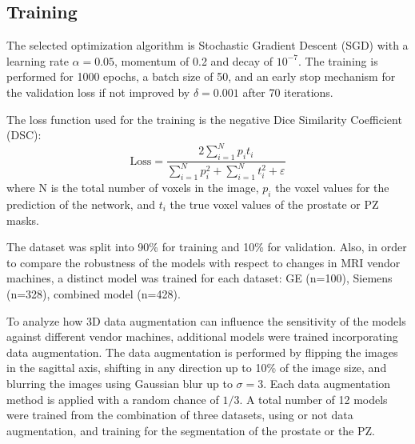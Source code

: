 \subsection{Training}
\label{subsec:training}
The selected optimization algorithm is Stochastic Gradient Descent (SGD) with a learning rate $\alpha = 0.05$, momentum of 0.2 and decay of $10^{-7}$. The training is performed for 1000 epochs, a batch size of 50, and an early stop mechanism for the validation loss if not improved by $\delta = 0.001$ after 70 iterations. 

The loss function used for the training is the negative Dice Similarity Coefficient (DSC):
\begin{equation}
\text{Loss} = \frac{2 \sum_{i=1}^{N}p_it_i}{\sum_{i=1}^{N}p_i^2 + \sum_{i=1}^{N}t_i^2 + \varepsilon} 
\label{eq:dsc}
\end{equation}
where N is the total number of voxels in the image, $p_i$ the voxel values for the prediction of the network, and $t_i$ the true voxel values of the prostate or PZ masks.

The dataset was split into 90\% for training and 10\% for validation. Also, in order to compare the robustness of the models with respect to changes in MRI vendor machines,  a distinct model was trained for each dataset: GE (n=100), Siemens (n=328), combined model (n=428). 

To analyze how 3D data augmentation can influence the sensitivity of the models against different vendor machines, additional models were trained incorporating data augmentation. The data augmentation is performed by flipping the images in the sagittal axis,  shifting in any direction up to 10\% of the image size, and blurring the images using Gaussian blur up to $\sigma = 3$. Each data augmentation method is applied with a random chance of $1/3$.  
A total number of 12 models were trained from the combination of three datasets, using or not data augmentation, and training for the segmentation of the prostate or the PZ. 
